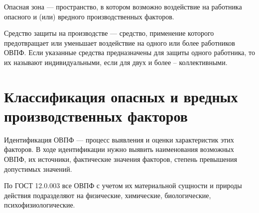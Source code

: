 Опасная зона --- пространство, в котором возможно воздействие на работника опасного и (или) вредного производственных факторов.

Средство защиты на производстве --- средство, применение которого предотвращает или уменьшает воздействие на одного или более работников ОВПФ. Если указанные средства предназначены для защиты одного работника, то их называют индивидуальными, если для двух и более -- коллективными.

\section{Классификация опасных и вредных производственных факторов}
Идентификация ОВПФ --- процесс выявления и оценки характеристик этих факторов. В ходе идентификации нужно выявить наименования возможных ОВПФ, их источники, фактические значения факторов, степень превышения допустимых значений.


По ГОСТ 12.0.003 все ОВПФ с учетом их материальной сущности и природы действия подразделяют на физические, химические, биологические, психофизиологические.



